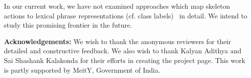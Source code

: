 \documentclass[twocolumn]{svjour3}          \smartqed  \usepackage{graphicx}
\begin{document}
In our current work, we have not examined approaches which map skeleton actions to lexical phrase representations (cf. class labels)~\cite{hahn2019action2vec,jasani2019skeleton} in detail. We intend to study this promising frontier in the future.

\noindent \textbf{Acknowledgements:} We wish to thank the anonymous reviewers for their detailed and constructive feedback. We also wish to thank Kalyan Adithya and Sai Shashank Kalakonda for their efforts in creating the project page. This work is partly supported by MeitY, Government of India.

 

\end{document}

